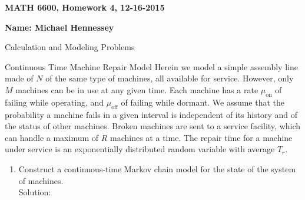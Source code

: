 \documentclass[12pt]{article}
\numberwithin{equation}{section}
\begin{document}
{\large\bf MATH 6600, Homework 4, 12-16-2015}

\vspace{6 ex}

{\bf Name: Michael Hennessey} \hfill

\vspace{6 ex}

\begin{section}{Calculation and Modeling Problems}
\begin{subsection}{Continuous Time Machine Repair Model}
Herein we model a simple assembly line made of $N$ of the same type of machines, all available for service. However, only $M$ machines can be in use at any given time. Each machine has a rate $\mu_{\text{on}}$ of failing while operating, and $\mu_{\text{off}}$ of failing while dormant. We assume that the probability a machine fails in a given interval is independent of its history and of the status of other machines. Broken machines are sent to a service facility, which can handle a maximum of $R$ machines at a time. The repair time for a machine under service is an exponentially distributed random variable with average $T_r$.
\begin{enumerate}
    \item Construct a continuous-time Markov chain model for the state of the system of machines.\\

    Solution:\\


\end{enumerate}
\end{subsection}
\end{section}
\end{document}
